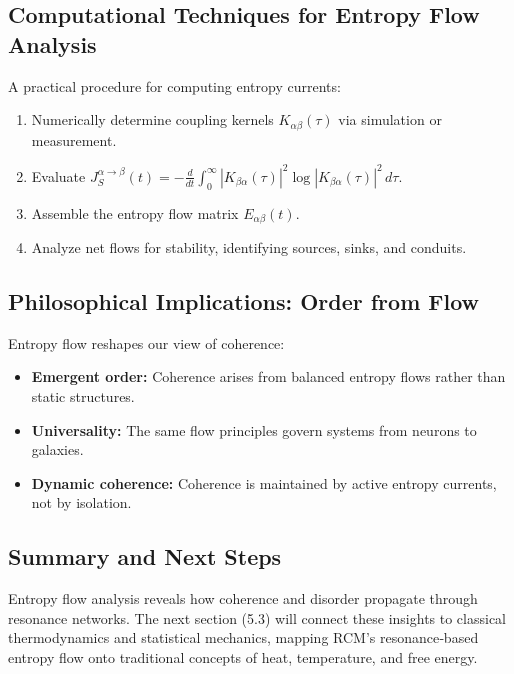 \subsection{Computational Techniques for Entropy Flow Analysis}

A practical procedure for computing entropy currents:
\begin{enumerate}
  \item Numerically determine coupling kernels \(K_{\alpha\beta}(\tau)\) via simulation or measurement.
  \item Evaluate
    \(\displaystyle
      J_{S}^{\alpha\to\beta}(t)
      = -\frac{d}{dt}\!\int_{0}^{\infty}|K_{\beta\alpha}(\tau)|^{2}\log|K_{\beta\alpha}(\tau)|^{2}\,d\tau.
    \)
  \item Assemble the entropy flow matrix \(E_{\alpha\beta}(t)\).
  \item Analyze net flows for stability, identifying sources, sinks, and conduits.
\end{enumerate}

\subsection{Philosophical Implications: Order from Flow}

Entropy flow reshapes our view of coherence:
\begin{itemize}
  \item \textbf{Emergent order:} Coherence arises from balanced entropy flows rather than static structures.
  \item \textbf{Universality:} The same flow principles govern systems from neurons to galaxies.
  \item \textbf{Dynamic coherence:} Coherence is maintained by active entropy currents, not by isolation.
\end{itemize}

\subsection{Summary and Next Steps}

Entropy flow analysis reveals how coherence and disorder propagate through resonance networks.  The next section (5.3) will connect these insights to classical thermodynamics and statistical mechanics, mapping RCM’s resonance‐based entropy flow onto traditional concepts of heat, temperature, and free energy.  

